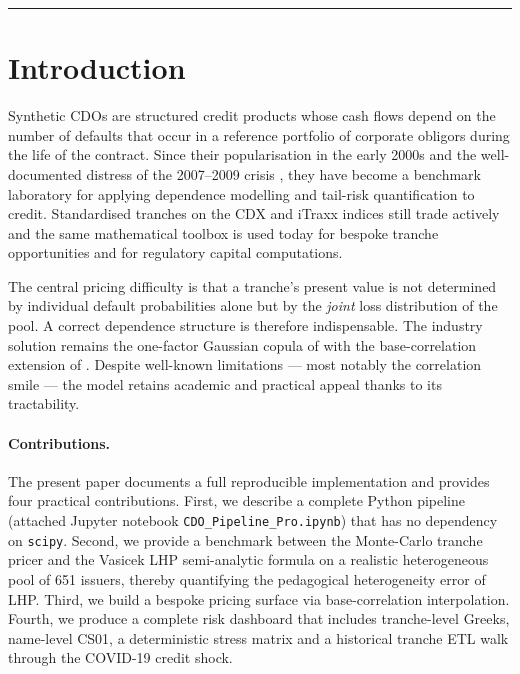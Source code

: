 \documentclass[11pt,a4paper]{article}
\newcommand{\1}{\mathbf{1}}
\begin{document}
\tableofcontents
\bigskip\hrule\bigskip

\section{Introduction}\label{sec:intro}

Synthetic CDOs are structured credit products whose cash flows depend on
the number of defaults that occur in a reference portfolio of corporate
obligors during the life of the contract.  Since their popularisation in
the early 2000s and the well-documented distress of the
2007--2009 crisis \citep{mounfield2009}, they have become a benchmark
laboratory for applying dependence modelling and tail-risk quantification
to credit. Standardised tranches on the CDX and iTraxx indices still trade
actively and the same mathematical toolbox is used today for bespoke
tranche opportunities and for regulatory capital computations.

The central pricing difficulty is that a tranche's present value is not
determined by individual default probabilities alone but by the
\emph{joint} loss distribution of the pool. A correct dependence structure
is therefore indispensable. The industry solution remains
the one-factor Gaussian copula of \citet{li2000,vasicek1987} with the
base-correlation extension of \citet{jpmorgan2004}.  Despite well-known
limitations --- most notably the correlation smile --- the model retains
academic and practical appeal thanks to its tractability.

\paragraph{Contributions.}
The present paper documents a full reproducible implementation and
provides four practical contributions.
First, we describe a complete Python pipeline (attached Jupyter notebook
\texttt{CDO\_Pipeline\_Pro.ipynb}) that has no dependency on
\texttt{scipy}. Second, we provide a benchmark between the Monte-Carlo
tranche pricer and the Vasicek LHP semi-analytic formula on a realistic
heterogeneous pool of 651 issuers, thereby quantifying the pedagogical
heterogeneity error of LHP. Third, we build a bespoke pricing surface
via base-correlation interpolation. Fourth, we produce a complete risk
dashboard that includes tranche-level Greeks, name-level CS01, a
deterministic stress matrix and a historical tranche ETL walk through
the COVID-19 credit shock.
\end{document}
